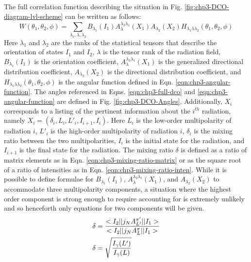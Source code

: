 The full correlation function describing the situation in Fig. \ref{fig:chp3-DCO-diagram-lvl-scheme} can be written as follows\cite{emInteraction,dcoKrane}:
\begin{equation}
\label{eqn:chp3-full-dco}
W\left(\theta{}_1,\theta{}_2,\phi{}\right) = \sum\limits_{\lambda{}_1,\lambda{},\lambda{}_2}^{} B_{\lambda{}_1}\left(I_1\right) A_{\lambda{}}^{\lambda{}_2\lambda{}_1}\left(X_1\right) A_{\lambda{}_2}\left(X_2\right) H_{\lambda{}_1\lambda{}\lambda{}_2}\left(\theta{}_1,\theta{}_2,\phi{}\right)
\end{equation}
Here $\lambda{}_1$ and $\lambda{}_2$ are the ranks of the statistical tensors that describe the orientation of states $I_1$ and $I_2$, $\lambda{}$ is the tensor rank of the radiation field, $B_{\lambda{}_1}\left(I_1\right)$ is the orientation coefficient, $A_{\lambda{}}^{\lambda{}_2\lambda{}_1}\left(X_1\right)$ is the generalized directional distribution coefficient, $A_{\lambda{}_2}\left(X_2\right)$ is the directional distribution coefficient, and $H_{\lambda{}_1\lambda{}\lambda{}_2}\left(\theta{}_1,\theta{}_2,\phi{}\right)$ is the angular function defined in Eqn. \ref{eqn:chp3-angular-function}. The angles referenced in Eqns. \ref{eqn:chp3-full-dco} and \ref{eqn:chp3-angular-function} are defined in Fig. \ref{fig:chp3-DCO-Angles}. Additionally, $X_i$ corresponds to a listing of the pertinent information about the $i^{th}$ radiation, namely $X_i = \left(\delta{}_i,L_i,L'_i,I_{i+1},I_i\right)$. Here $L_i$ is the low-order multipolarity of radiation $i$, $L'_i$ is the high-order multipolarity of radiation $i$, $\delta{}_i$ is the mixing ratio between the two multipolarities, $I_i$ is the initial state for the radiation, and $I_{i+1}$ is the final state for the radiation. The mixing ratio $\delta{}$ is defined as a ratio of matrix elements as in Eqn. \ref{eqn:chp3-mixing-ratio-matrix} or as the square root of a ratio of intensities as in Eqn. \ref{eqn:chp3-mixing-ratio-inten}. While it is possible to define formulae for $B_{\lambda{}_1}\left(I_1\right)$, $A_{\lambda{}}^{\lambda{}_2\lambda{}_1}\left(X_1\right)$, and $A_{\lambda{}_2}\left(X_2\right)$ to accommodate three multipolarity components, a situation where the highest order component is strong enough to require accounting for is extremely unlikely and so henceforth only equations for two components will be given.
\begin{align}
\delta{} &= \frac{<I_2||\boldmath{j_NA^{\pi{}'}_{L'}}||I_1>}{<I_2||\boldmath{j_NA^{\pi{}}_{L}}||I_1>} \label{eqn:chp3-mixing-ratio-matrix}\\
\delta{} &= \sqrt{\frac{I_{\gamma{}}(L')}{I_{\gamma{}}(L)}} \label{eqn:chp3-mixing-ratio-inten}
\end{align}

